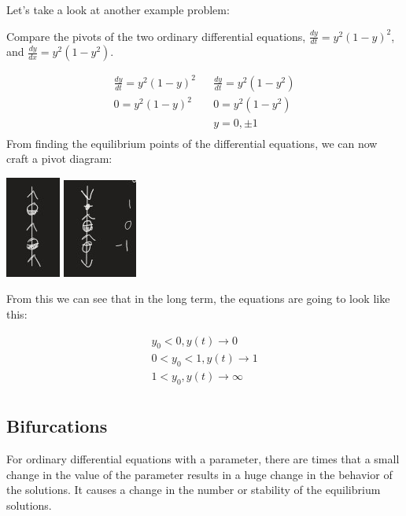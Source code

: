   Let's take a look at another example problem:

  \begin{problem}
    Compare the pivots of the two ordinary differential equations, $\frac{dy}{dt}=y^2(1-y)^2$, and $\frac{dy}{dx}=y^2(1-y^2)$.

    \begin{align*}
      \frac{dy}{dt}=y^2(1-y)^2 && \frac{dy}{dt}=y^2(1-y^2)\\
      0=y^2(1-y)^2 && 0=y^2(1-y^2)\\
      && y=0,\pm1\\
    \end{align*}
    From finding the equilibrium points of the differential equations, we can now craft a pivot diagram:\newline
    \begin{center}
    \includegraphics{resource/images/2.7 Example 2-1.jpg}
    \includegraphics{resource/images/2.7 Example 2-2.jpg}
    \end{center}

    From this we can see that in the long term, the equations are going to look like this:

    \begin{align*}
      y_0<0,y(t)\to0\\
      0<y_0<1,y(t)\to1\\
      1<y_0,y(t)\to\infty\\
    \end{align*}
  \end{problem}

  \subsection{Bifurcations}

  For ordinary differential equations with a parameter, there are times that a small change in the value of the parameter results in a huge change in the behavior of the solutions. It causes a change in the number or stability of the equilibrium solutions.

